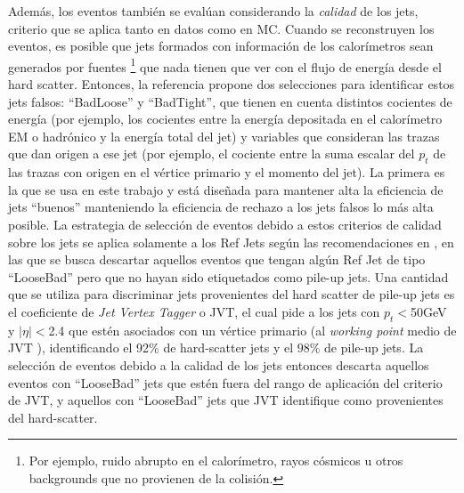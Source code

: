 Además, los eventos también se evalúan considerando la \textit{calidad} de los jets, criterio que se aplica tanto en datos como en MC. Cuando se reconstruyen los eventos, es posible que jets formados con información de los calorímetros sean generados por fuentes \footnote{Por ejemplo, ruido abrupto en el calorímetro, rayos cósmicos u otros backgrounds que no provienen de la colisión.} que nada tienen que ver con el flujo de energía desde el hard scatter. Entonces, la referencia \cite{JetCleaning} propone dos selecciones para identificar estos jets falsos: ``BadLoose'' y ``BadTight'', que tienen en cuenta distintos cocientes de energía (por ejemplo, los cocientes entre la energía depositada en el calorímetro EM o hadrónico y la energía total del jet) y variables que consideran las trazas que dan origen a ese jet (por ejemplo, el cociente entre la suma escalar del $p_t$ de las trazas con origen en el vértice primario y el momento del jet). La primera es la que se usa en este trabajo y  está diseñada para mantener alta la eficiencia de jets ``buenos'' manteniendo la eficiencia de rechazo a los jets falsos lo más alta posible. La estrategia de selección de eventos debido a estos criterios de calidad sobre los jets se aplica solamente a los Ref Jets según las recomendaciones en \cite{JetCleaningTool}, en las que se busca descartar aquellos eventos que tengan algún Ref Jet de tipo ``LooseBad'' pero que no hayan sido etiquetados como pile-up jets. Una cantidad que se utiliza para discriminar jets provenientes del hard scatter de pile-up jets es el coeficiente de \textit{Jet Vertex Tagger} o JVT, el cual pide a los jets con $p_t<$50GeV y $|\eta|<$2.4 que estén asociados con un vértice primario (al \textit{working point} medio de JVT \cite{JVTtool}), identificando el 92$\%$ de hard-scatter jets y el $98\%$ de pile-up jets. La selección de eventos debido a la calidad de los jets entonces descarta aquellos eventos con ``LooseBad'' jets que estén fuera del rango de aplicación del criterio de JVT, y aquellos con ``LooseBad'' jets que JVT identifique como provenientes del hard-scatter. \\ 


